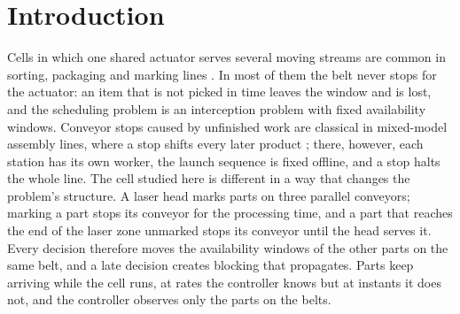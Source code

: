 \documentclass[11pt,a4paper]{article}
\theoremstyle{plain}
\theoremstyle{definition}
\theoremstyle{remark}
\begin{document}
\section{Introduction}
Cells in which one shared actuator serves several moving streams are common in sorting,
packaging and marking lines \cite{S01_Mattone2000,S02_Han2020,S03_Nielsen2023,S04_Schettini2023}.
In most of them the belt never stops for the actuator: an item that is not picked in time
leaves the window and is lost, and the scheduling problem is an interception problem with
fixed availability windows. Conveyor stops caused by unfinished work are classical in
mixed-model assembly lines, where a stop shifts every later product
\cite{Xiaobo2000,Tamura2011}; there, however, each station has its own worker, the launch
sequence is fixed offline, and a stop halts the whole line. The cell studied here is
different in a way that changes the problem's structure. A laser head marks parts on three parallel conveyors; marking a part
stops its conveyor for the processing time, and a part that reaches the end of the laser
zone unmarked stops its conveyor until the head serves it. Every decision therefore moves
the availability windows of the other parts on the same belt, and a late decision creates
blocking that propagates. Parts keep arriving while the cell runs, at rates the
controller knows but at instants it does not, and the controller observes only the parts
on the belts.
\end{document}
